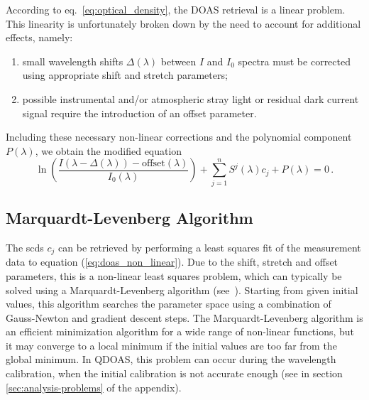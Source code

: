 According to eq.\ \eqref{eq:optical_density}, the DOAS retrieval is a
linear problem. This linearity is unfortunately broken down by the
need to account for additional effects, namely:
\begin{enumerate}
\item small wavelength shifts $\Delta(\lambda)$ between $I$ and $I_0$
  spectra must be corrected using appropriate shift and stretch
  parameters;
\item possible instrumental and/or atmospheric stray light or residual
  dark current signal require the introduction of an offset parameter.
\end{enumerate}
Including these necessary non-linear corrections and the polynomial
component $P(\lambda)$, we obtain the modified equation
\begin{equation}\label{eq:doas_non_linear}
\ln\left(
  \frac{I(\lambda-\Delta(\lambda))-\mathrm{offset}(\lambda)}{I_0(\lambda)}
  \right)+\sum_{j=1}^nS^j(\lambda)c_j +P(\lambda) = 0\,.
\end{equation}

\subsection{Marquardt-Levenberg Algorithm}\label{sec:marq-levenb-algor}
The \glspl{scd} $c_j$ can be retrieved by performing a least squares
fit of the measurement data to equation (\ref{eq:doas_non_linear}).
Due to the shift, stretch and offset parameters, this is a non-linear
least squares problem, which can typically be solved using a
Marquardt-Levenberg algorithm
(see~\citet{Marquardt1963,Bevington1969}).  Starting from given
initial values, this algorithm searches the parameter space using a
combination of Gauss-Newton and gradient descent steps.  The
Marquardt-Levenberg algorithm is an efficient minimization algorithm
for a wide range of non-linear functions, but it may converge to a
local minimum if the initial values are too far from the global
minimum.  In QDOAS, this problem can occur during the wavelength
calibration, when the initial calibration is not accurate enough (see
 in section
\ref{sec:analysis-problems} of the appendix).

